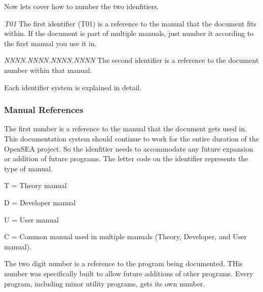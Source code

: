 Now lets cover how to number the two idenfitiers.


\begin{DoxyEnumerate}
\item {\itshape T01} The first identifier (T01) is a reference to the manual that the document fits within. If the document is part of multiple manuals, just number it according to the first manual you use it in.
\item {\itshape N\-N\-N\-N.\-N\-N\-N\-N.\-N\-N\-N\-N.\-N\-N\-N\-N} The second identifier is a reference to the document number within that manual.
\end{DoxyEnumerate}

Each identifier system is explained in detail.\hypertarget{docnumbersys_docnumbersys_man}{}\subsubsection{Manual References}\label{docnumbersys_docnumbersys_man}
The first number is a reference to the manual that the document gets used in. This documentation system should continue to work for the entire duration of the Open\-S\-E\-A project. So the idenfitier needs to accommodate any future expansion or addition of future programs. The letter code on the identifier represents the type of manual.
\begin{DoxyEnumerate}
\item T = Theory manual
\item D = Developer manual
\item U = User manual
\item C = Common manual used in multiple manuals (Theory, Developer, and User manual).
\end{DoxyEnumerate}

The two digit number is a reference to the program being documented. T\-His number was specifically built to allow future additions of other programs. Every program, including minor utility programs, gets its own number.

